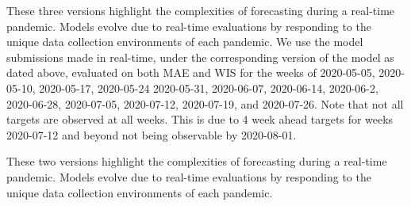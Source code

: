 \documentclass[11pt]{amsart}
\begin{document}
 
 These three versions highlight the complexities of forecasting during a real-time pandemic. Models evolve due to real-time evaluations by responding to the unique data collection environments of each pandemic. We use the model submissions made in real-time, under the corresponding version of the model as dated above, evaluated on both MAE and WIS for the weeks of 2020-05-05, 2020-05-10, 2020-05-17, 2020-05-24 2020-05-31, 2020-06-07, 2020-06-14, 2020-06-2, 2020-06-28, 2020-07-05, 2020-07-12, 2020-07-19, and 2020-07-26. Note that not all targets are observed at all weeks. This is due to 4 week ahead targets for weeks 2020-07-12 and beyond not being observable by 2020-08-01.
  
 
 These two versions highlight the complexities of forecasting during a real-time pandemic. Models evolve due to real-time evaluations by responding to the unique data collection environments of each pandemic.
\end{document}
